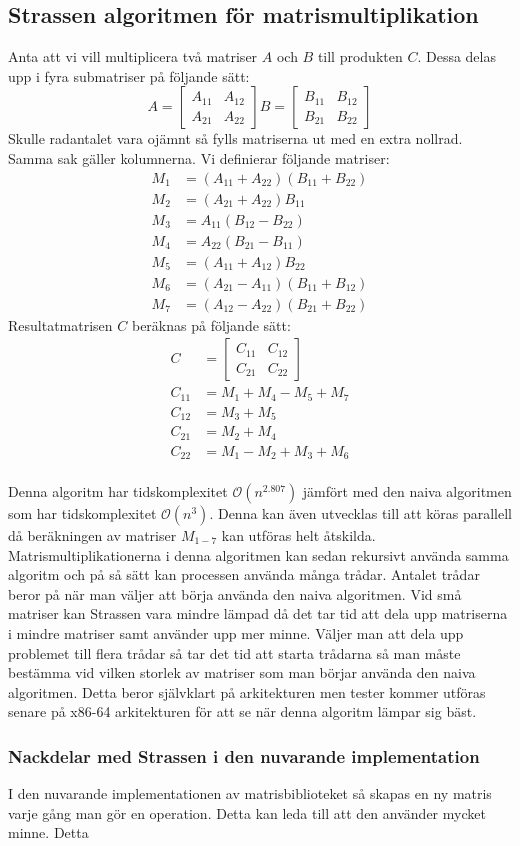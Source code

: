 \subsection{Strassen algoritmen för matrismultiplikation}
\label{sec:strassen}
Anta att vi vill multiplicera två matriser $A$ och $B$ till produkten $C$. Dessa delas upp i fyra submatriser på följande sätt:
 $$A=\begin{bmatrix}
A_{11} & A_{12} \\
A_{21}& A_{22}
 \end{bmatrix}
 B=\begin{bmatrix}
B_{11} & B_{12} \\
B_{21}& B_{22}
 \end{bmatrix}
 $$
 Skulle radantalet vara ojämnt så fylls matriserna ut med en extra nollrad. Samma sak gäller kolumnerna.
 Vi definierar följande matriser:
  \begin{align*}
  M_1 & =(A_{11}+A_{22})(B_{11}+B_{22}) \\
  M_2 & =(A_{21}+A_{22})B_{11} \\
  M_3 & =A_{11}(B_{12}-B_{22}) \\
  M_4 & =A_{22}(B_{21}-B_{11}) \\
  M_5 & =(A_{11}+A_{12})B_{22} \\
  M_6 & =(A_{21}-A_{11})(B_{11}+B_{12}) \\
  M_7 & =(A_{12}-A_{22})(B_{21}+B_{22}) 
 \end{align*}
 Resultatmatrisen $C$ beräknas på följande sätt:
   \begin{align*}
    C & =\begin{bmatrix}
C_{11} & C_{12} \\
C_{21}& C_{22}
 \end{bmatrix} \\
  C_{11} & =M_1+M_4-M_5+M_7 \\
  C_{12} & = M_3+M_5 \\
  C_{21} & = M_2+M_4 \\
  C_{22} & = M_1-M_2+M_3+M_6
 \end{align*}
 \\
Denna algoritm har tidskomplexitet $\mathcal{O}(n^{2.807})$ jämfört med den naiva algoritmen som har tidskomplexitet $\mathcal{O}(n^{3})$. Denna kan även utvecklas till att köras parallell då beräkningen av matriser $M_{1-7}$ kan utföras helt åtskilda. Matrismultiplikationerna i denna algoritmen kan sedan rekursivt använda samma algoritm och på så sätt kan processen använda många trådar. Antalet trådar beror på när man väljer att börja använda den naiva algoritmen. Vid små matriser kan Strassen vara mindre lämpad då det tar tid att dela upp matriserna i mindre matriser samt använder upp mer minne. Väljer man att dela upp problemet till flera trådar så tar det tid att starta trådarna så man måste bestämma vid vilken storlek av matriser som man börjar använda den naiva algoritmen. Detta beror självklart på arkitekturen men tester kommer utföras senare på x86-64 arkitekturen för att se när denna algoritm lämpar sig bäst. 
 \subsubsection{Nackdelar med Strassen i den nuvarande implementation}
 I den nuvarande implementationen av matrisbiblioteket så skapas en ny matris varje gång man gör en operation. Detta kan leda till att den använder mycket minne. Detta 
 

 
 
